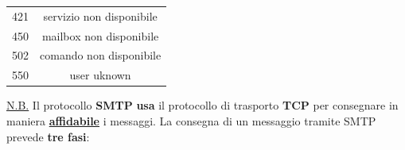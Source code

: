 \documentclass[11pt,a4paper,oneside]{book}
\theoremstyle{definition}
\begin{document}
\begin{itemize}
\begin{table}[h!]
\begin{center}
\begin{tabular}{l|c}
				      421             & servizio non disponibile                 \\
				      450             & mailbox non disponibile                  \\
				      502             & comando non disponibile                  \\
				      550 			  & user uknown                              \\
			      \end{tabular}
		      \end{center}
	      \end{table}
\end{itemize}

\pagebreak

\underline{N.B.} Il protocollo \textbf{SMTP} \textbf{usa} il protocollo di trasporto \textbf{TCP} per consegnare in maniera \textbf{\underline{affidabile}} i messaggi.\newline\newline
La consegna di un messaggio tramite SMTP prevede \textbf{tre fasi}:
\end{document}
